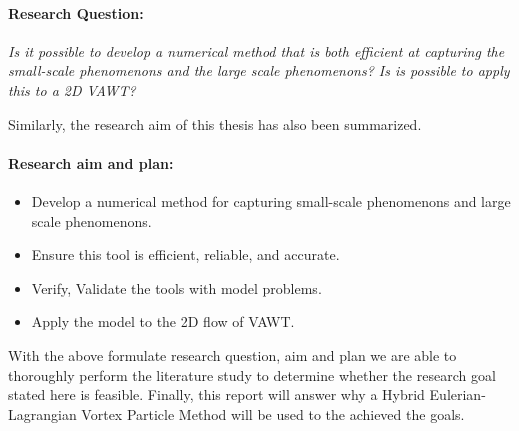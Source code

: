\paragraph*{Research Question:} \textit{Is it possible to develop a numerical method that is both efficient at capturing the small-scale phenomenons and the large scale phenomenons? Is is possible to apply this to a 2D VAWT?}

Similarly, the research aim of this thesis has also been summarized.

\paragraph*{Research aim and plan:}
\begin{itemize}
\item Develop a numerical method for capturing small-scale phenomenons and large scale phenomenons.
\item Ensure this tool is efficient, reliable, and accurate.
\item Verify, Validate the tools with model problems.
\item Apply the model to the 2D flow of VAWT.
\end{itemize}

With the above formulate research question, aim and plan we are able to thoroughly perform the literature study to determine whether the research goal stated here is feasible. Finally, this report will answer why a Hybrid Eulerian-Lagrangian Vortex Particle Method will be used to the achieved the goals. 



